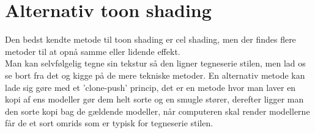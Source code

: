\section{Alternativ toon shading}
Den bedst kendte metode til toon shading er cel shading, men der findes flere metoder til at opnå samme eller lidende effekt.\\
Man kan selvfølgelig tegne sin tekstur så den ligner tegneserie stilen, men lad os se bort fra det og kigge på de mere tekniske metoder. En alternativ metode kan lade sig gøre med et ’clone-push’ princip,\cite{clone-push} det er en metode hvor man laver en kopi af ens modeller gør dem helt sorte og en smugle stører, derefter ligger man den sorte kopi bag de gældende modeller, når computeren skal render modellerne får de et sort omrids som er typisk for tegneserie stilen.